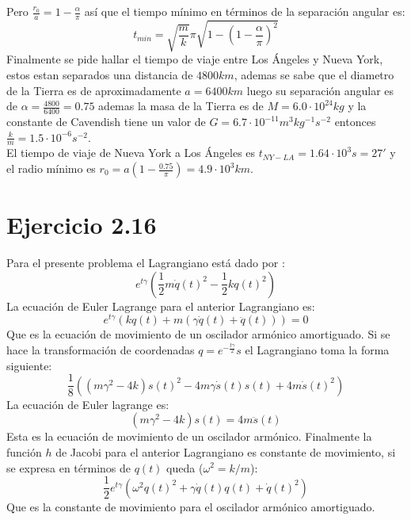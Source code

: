 \documentclass[letterpaper,10pt]{article}
\begin{document}
Pero $\frac{r_0}{a}=1-\frac{\alpha}{\pi}$ as\'i que el tiempo m\'inimo en t\'erminos de la separaci\'on angular es:
$$
t_{min}=\sqrt{\frac{m}{k}} \pi \sqrt{1-\left(1-\frac{\alpha}{\pi}\right)^2}
$$
Finalmente se pide hallar el tiempo de viaje entre Los \'Angeles y Nueva York, estos estan separados una distancia de $4800 km$, ademas se sabe que el diametro de la Tierra es de aproximadamente $a=6400 km$ luego su separaci\'on angular es de $\alpha=\frac{4800}{6400}=0.75$ ademas la masa de la Tierra es de $M=6.0\cdot10^{24} kg$ y la constante de Cavendish tiene un valor de $G=6.7 \cdot 10^{-11} m^3 kg^{-1} s^{-2}$ entonces $\frac{k}{m}=1.5 \cdot 10^{-6} s^{-2}$.\\
El tiempo de viaje de Nueva York a Los \'Angeles es $t_{NY-LA}=1.64\cdot10^3 s=27'$ y el radio m\'inimo es $r_0=a \left(1-\frac{0.75}{\pi}\right)=4.9\cdot 10^3 km$.









\section*{Ejercicio 2.16}
Para el presente problema el Lagrangiano est\'a dado por :
\begin{equation}
e^{t \gamma } \left(\frac{1}{2} m
   \dot q(t)^2-\frac{1}{2} k q(t)^2\right)
\label{kl}
\end{equation}
La ecuaci\'on de Euler Lagrange para el anterior Lagrangiano es:
\begin{equation}
e^{t \gamma } \left(k q(t)+m \left(\gamma 
   \dot q(t)+\ddot q(t)\right)\right)=0
\end{equation}
Que es la ecuaci\'on de movimiento de un oscilador arm\'onico amortiguado.
Si se hace la transformaci\'on de coordenadas $q=e^{-\frac{t \gamma }{2}} s $ el Lagrangiano toma la forma siguiente:
\begin{equation}
\frac{1}{8} \left(\left(m \gamma ^2-4 k\right)
   s(t)^2-4 m \gamma  \dot s(t) s(t)+4 m
   \dot s(t)^2\right)
\end{equation}
La ecuaci\'on de Euler lagrange es:
\begin{equation}
\left(m \gamma ^2-4 k\right) s(t)=4 m \ddot s(t)
\end{equation}
Esta es la ecuaci\'on de movimiento de un oscilador arm\'onico.
Finalmente la funci\'on $h$ de Jacobi para el anterior Lagrangiano es constante de movimiento, si se expresa en t\'erminos de $q(t)$ queda ($\omega^2=k/m$):
\begin{equation}
 \frac{1}{2} e^{t \gamma } \left(\omega ^2
   q(t)^2+\gamma  \dot q(t) q(t)+\dot q(t)^2\right)
\end{equation}
Que es la constante de movimiento para el oscilador arm\'onico amortiguado.
 
\end{document}
